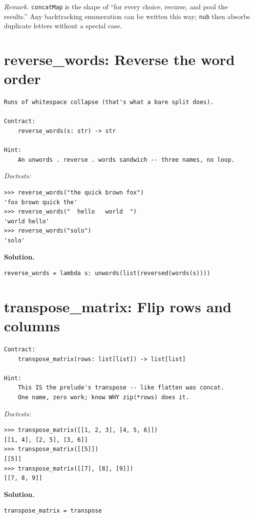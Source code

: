 \documentclass[11pt,letterpaper]{book}
\begin{document}
\noindent\textit{Remark.} \texttt{concatMap} is the shape of ``for every choice,
recurse, and pool the results.'' Any backtracking enumeration can be written this
way; \texttt{nub} then absorbs duplicate letters without a special case.

\section{reverse\_words: Reverse the word order}
\begin{lstlisting}[style=spec]
Runs of whitespace collapse (that's what a bare split does).

Contract:
    reverse_words(s: str) -> str

Hint:
    An unwords . reverse . words sandwich -- three names, no loop.
\end{lstlisting}
\noindent\textit{Doctests:}
\begin{lstlisting}[style=spec]
>>> reverse_words("the quick brown fox")
'fox brown quick the'
>>> reverse_words("  hello   world  ")
'world hello'
>>> reverse_words("solo")
'solo'
\end{lstlisting}
\noindent\textbf{Solution.}
\begin{lstlisting}[style=code]
reverse_words = lambda s: unwords(list(reversed(words(s))))
\end{lstlisting}

\section{transpose\_matrix: Flip rows and columns}
\begin{lstlisting}[style=spec]
Contract:
    transpose_matrix(rows: list[list]) -> list[list]

Hint:
    This IS the prelude's transpose -- like flatten was concat.
    One name, zero work; know WHY zip(*rows) does it.
\end{lstlisting}
\noindent\textit{Doctests:}
\begin{lstlisting}[style=spec]
>>> transpose_matrix([[1, 2, 3], [4, 5, 6]])
[[1, 4], [2, 5], [3, 6]]
>>> transpose_matrix([[5]])
[[5]]
>>> transpose_matrix([[7], [8], [9]])
[[7, 8, 9]]
\end{lstlisting}
\noindent\textbf{Solution.}
\begin{lstlisting}[style=code]
transpose_matrix = transpose
\end{lstlisting}
\end{document}
